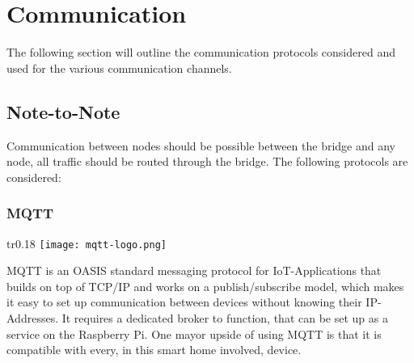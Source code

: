 
    \section{Communication}
    The following section will outline the communication protocols 
    considered and used for the various communication channels.
    
        \subsection{Note-to-Note}
        Communication between nodes should be possible between the bridge and
        any node, all traffic should be routed through the bridge.
        The following protocols are considered:
            \subsubsection{MQTT}
            \begin{wrapfigure}[2]{tr}{0.18\textwidth} %
                \vspace{-1cm}
                \hspace{3cm}
                \texttt{[image: mqtt-logo.png]}
            \end{wrapfigure}
            MQTT \cite{mqtt_nodate} is an OASIS standard messaging protocol for 
            IoT-Applications that builds on top of TCP/IP and 
            works on a publish/subscribe model, which makes it easy
            to set up communication between devices without knowing
            their IP-Addresses. It requires a dedicated broker to
            function, that can be set up as a service on the 
            Raspberry Pi.
            One mayor upside of using MQTT is that it is compatible
            with every, in this smart home involved, device.
        
        

